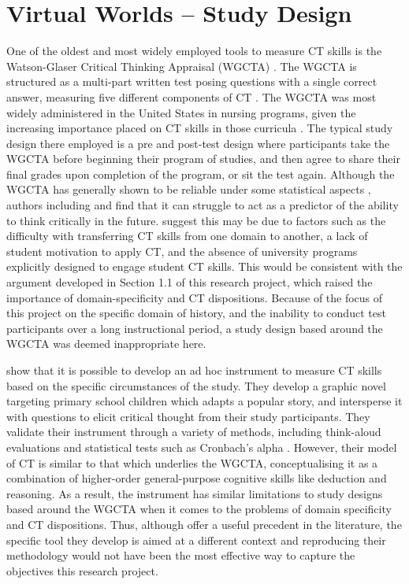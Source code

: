 \documentclass{l4proj}
\begin{document}
\section{Virtual Worlds – Study Design}
One of the oldest and most widely employed tools to measure CT skills is the Watson-Glaser Critical Thinking Appraisal (WGCTA) \citep{bernard2008exploring}. The WGCTA is structured as a multi-part written test posing questions with a single correct answer, measuring five different components of CT \citep{bernard2008exploring}. The WGCTA was most widely administered in the United States in nursing programs, given the increasing importance placed on CT skills in those curricula \citep{bauwens1987use}. The typical study design there employed is a pre and post-test design where participants take the WGCTA before beginning their program of studies, and then agree to share their final grades upon completion of the program, or sit the test again. Although the WGCTA has generally shown to be reliable under some statistical aspects \citep{bernard2008exploring, bauwens1987use, crouch2015predicting, el2007validating}, authors including \citet{crouch2015predicting} and \citet{el2007validating} find that it can struggle to act as a predictor of the ability to think critically in the future. \citet{el2007validating} suggest this may be due to factors such as the difficulty with transferring CT skills from one domain to another, a lack of student motivation to apply CT, and the absence of university programs explicitly designed to engage student CT skills. This would be consistent with the argument developed in Section 1.1 of this research project, which raised the importance of domain-specificity and CT dispositions. Because of the focus of this project on the specific domain of history, and the inability to conduct test participants over a long instructional period, a study design based around the WGCTA was deemed inappropriate here. 

\citet{gelerstein2016designing} show that it is possible to develop an ad hoc instrument to measure CT skills based on the specific circumstances of the study. They develop a graphic novel targeting primary school children which adapts a popular story, and intersperse it with questions to elicit critical thought from their study participants. They validate their instrument through a variety of methods, including think-aloud evaluations and statistical tests such as Cronbach’s alpha \citep{gelerstein2016designing}. However, their model of CT is similar to that which underlies the WGCTA, conceptualising it as a combination of higher-order general-purpose cognitive skills like deduction and reasoning. As a result, the instrument has similar limitations to study designs based around the WGCTA when it comes to the problems of domain specificity and CT dispositions. Thus, although \citet{gelerstein2016designing} offer a useful precedent in the literature, the specific tool they develop is aimed at a different context and reproducing their methodology would not have been the most effective way to capture the objectives this research project.   
\end{document}

